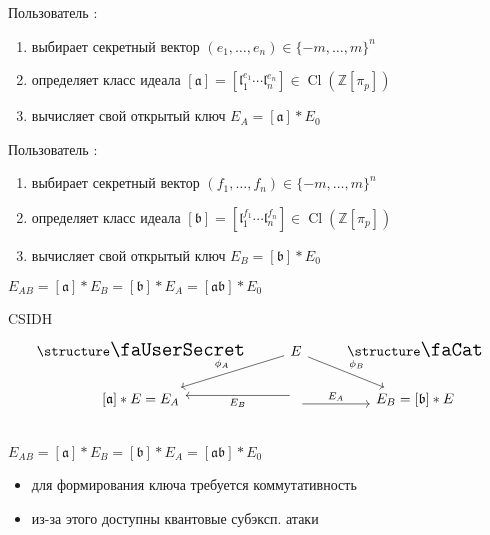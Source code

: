 \documentclass{beamer}
\begin{document}
\begin{frame}
	
	\vspace{1em}
	Пользователь \UserA:
	\begin{enumerate}
		\item выбирает секретный вектор $(e_1, \ldots, e_n) \in \lbrace -m,\ldots ,m \rbrace ^n$
		\item определяет класс идеала $[\mathfrak{a}]=[\mathfrak{l}_1^{e_1}\cdots \mathfrak{l}_n^{e_n}]\in \operatorname{Cl}(\mathbb{Z}[\pi_p])$%
		\item вычисляет свой открытый ключ $E_A = [\mathfrak{a}]*E_0$
	\end{enumerate}
	
	\vspace{1em}
	Пользователь \UserB:
	
	\begin{enumerate}
		\item выбирает секретный вектор $(f_1,\ldots ,f_n) \in \lbrace -m,\ldots ,m \rbrace ^n$
		\item определяет класс идеала $[\mathfrak{b}]=[\mathfrak{l}_1^{f_1}\cdots \mathfrak{l}_n^{f_n}]\in \operatorname{Cl}(\mathbb{Z}[\pi_p])$
		\item вычисляет свой открытый ключ $E_B = [\mathfrak{b}]*E_0$
	\end{enumerate}
	
	\vspace{1em}
	 $E_{AB} = [\mathfrak{a}] * E_B = [\mathfrak{b}] * E_A = [\mathfrak{a}\mathfrak{b}] * E_0$
\end{frame}

\begin{frame}[fragile]{CSIDH}
	\[
	\begin{tikzcd}
		\text{\UserA} &\arrow{ld}[swap]{\phi_{A}} E  \arrow{rd}{\phi_{B}} & \text{\UserB} \\
		\left[\mathfrak{a}\right] * E  = E_A&
		\arrow[yshift=-0.7ex]{r}{E_A}
		\arrow[yshift=0.7ex]{l}{E_B}
		& E_B = \left[\mathfrak{b}\right] * E\\
	\end{tikzcd}
	\]
	\vspace{-0.5em}
	 $E_{AB} = [\mathfrak{a}] * E_B = [\mathfrak{b}] * E_A = [\mathfrak{a}\mathfrak{b}] * E_0$
	\vspace{0.5em}
	\begin{itemize}
		\item для формирования ключа требуется коммутативность
		\item из-за этого доступны квантовые субэксп. атаки
	\end{itemize}

\end{frame}
\end{document}
